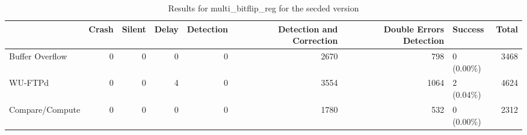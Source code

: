 \begin{table}[t]
	\centering
	\caption{Results for multi_bitflip_reg for the secded version}
	\label{table:end_sim_by_status_secded_5_multi_bitflip_reg}
	\begin{tabular}{lrrrrrrlr}
		\toprule
		                & Crash & Silent & Delay & Detection & Detection and Correction & Double Errors Detection & Success    & Total \\
		\midrule
		Buffer Overflow & 0     & 0      & 0     & 0         & 2670                     & 798                     & 0 (0.00\%) & 3468  \\
		WU-FTPd         & 0     & 0      & 4     & 0         & 3554                     & 1064                    & 2 (0.04\%) & 4624  \\
		Compare/Compute & 0     & 0      & 0     & 0         & 1780                     & 532                     & 0 (0.00\%) & 2312  \\
		\bottomrule
	\end{tabular}
\end{table}
